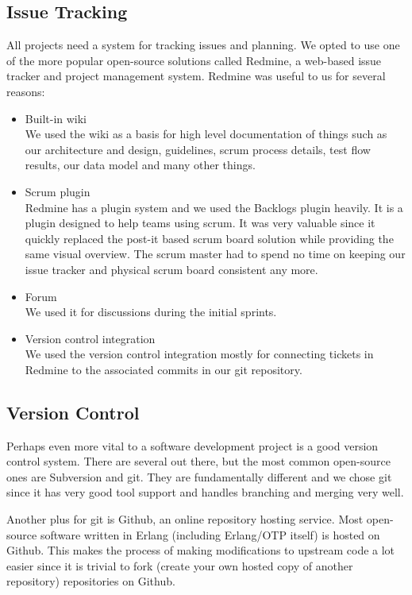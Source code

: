 \documentclass[11pt,a4paper]{report}
\begin{document}
\subsection{Issue Tracking}
All projects need a system for tracking issues and planning. We opted to use
one of the more popular open-source solutions called Redmine, a web-based issue
tracker and project management system. Redmine was useful to us for several
reasons:
\begin{itemize}
\item Built-in wiki \\
  We used the wiki as a basis for high level documentation of things such as our
  architecture and design, guidelines, scrum process details, test flow results,
  our data model and many other things.
\item Scrum plugin \\
  Redmine has a plugin system and we used the Backlogs plugin heavily. It is a
  plugin designed to help teams using scrum. It was very valuable since it
  quickly replaced the post-it based scrum board solution while providing the
  same visual overview. The scrum master had to spend no time on keeping our
  issue tracker and physical scrum board consistent any more.
\item Forum \\
  We used it for discussions during the initial sprints.
\item Version control integration \\
  We used the version control integration mostly for connecting tickets in
  Redmine to the associated commits in our git repository.
\end{itemize}
\subsection{Version Control}
Perhaps even more vital to a software development project is a good version
control system. There are several out there, but the most common open-source
ones are Subversion and git. They are fundamentally different and we chose git
since it has very good tool support and handles branching and merging very well.

Another plus for git is Github, an online repository hosting service. Most
open-source software written in Erlang (including Erlang/OTP itself) is hosted
on Github. This makes the process of making modifications to upstream code a lot
easier since it is trivial to fork (create your own hosted copy of another
repository) repositories on Github.
\end{document}
